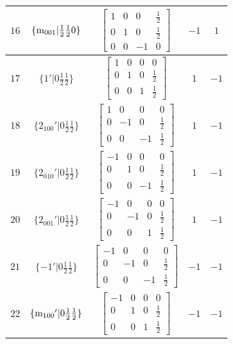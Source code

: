 \documentclass[fleqn,8pt]{jsarticle}
\begin{document}
\begin{longtable}{ccccc}
$ 16 $ & $ \{{\rm m}_{001}|\frac{1}{2} \frac{1}{2} 0\} $ & $ \begin{bmatrix} 1 & 0 & 0 & \frac{1}{2} \\ 0 & 1 & 0 & \frac{1}{2} \\ 0 & 0 & -1 & 0 \end{bmatrix} $ & $ -1 $ & $ 1 $ \\ \hline
$ 17 $ & $ \{1{}'|0 \frac{1}{2} \frac{1}{2}\} $ & $ \begin{bmatrix} 1 & 0 & 0 & 0 \\ 0 & 1 & 0 & \frac{1}{2} \\ 0 & 0 & 1 & \frac{1}{2} \end{bmatrix} $ & $ 1 $ & $ -1 $ \\ \hline
$ 18 $ & $ \{2{}_{100}{}'|0 \frac{1}{2} \frac{1}{2}\} $ & $ \begin{bmatrix} 1 & 0 & 0 & 0 \\ 0 & -1 & 0 & \frac{1}{2} \\ 0 & 0 & -1 & \frac{1}{2} \end{bmatrix} $ & $ 1 $ & $ -1 $ \\ \hline
$ 19 $ & $ \{2{}_{010}{}'|0 \frac{1}{2} \frac{1}{2}\} $ & $ \begin{bmatrix} -1 & 0 & 0 & 0 \\ 0 & 1 & 0 & \frac{1}{2} \\ 0 & 0 & -1 & \frac{1}{2} \end{bmatrix} $ & $ 1 $ & $ -1 $ \\ \hline
$ 20 $ & $ \{2{}_{001}{}'|0 \frac{1}{2} \frac{1}{2}\} $ & $ \begin{bmatrix} -1 & 0 & 0 & 0 \\ 0 & -1 & 0 & \frac{1}{2} \\ 0 & 0 & 1 & \frac{1}{2} \end{bmatrix} $ & $ 1 $ & $ -1 $ \\ \hline
$ 21 $ & $ \{-1{}'|0 \frac{1}{2} \frac{1}{2}\} $ & $ \begin{bmatrix} -1 & 0 & 0 & 0 \\ 0 & -1 & 0 & \frac{1}{2} \\ 0 & 0 & -1 & \frac{1}{2} \end{bmatrix} $ & $ -1 $ & $ -1 $ \\ \hline
$ 22 $ & $ \{{\rm m}_{100}{}'|0 \frac{1}{2} \frac{1}{2}\} $ & $ \begin{bmatrix} -1 & 0 & 0 & 0 \\ 0 & 1 & 0 & \frac{1}{2} \\ 0 & 0 & 1 & \frac{1}{2} \end{bmatrix} $ & $ -1 $ & $ -1 $ \\ \hline

\end{longtable}
\end{document}
